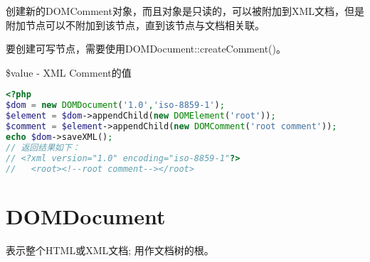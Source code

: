 创建新的DOMComment对象，而且对象是只读的，可以被附加到XML文档，但是附加节点可以不附加到该节点，直到该节点与文档相关联。

要创建可写节点，需要使用DOMDocument::createComment()。

\begin{compactitem}
\item \$value - XML Comment的值
\end{compactitem}


\begin{lstlisting}[language=PHP]
<?php
$dom = new DOMDocument('1.0','iso-8859-1');
$element = $dom->appendChild(new DOMElement('root'));
$comment = $element->appendChild(new DOMComment('root comment'));
echo $dom->saveXML(); 
// 返回结果如下：
// <?xml version="1.0" encoding="iso-8859-1"?>
//   <root><!--root comment--></root>
\end{lstlisting}



\section{DOMDocument}

表示整个HTML或XML文档; 用作文档树的根。


